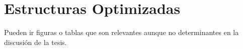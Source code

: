 \chapter{Estructuras Optimizadas}
Pueden ir figuras o tablas que son relevantes aunque no determinantes en la discusión de la tesis.